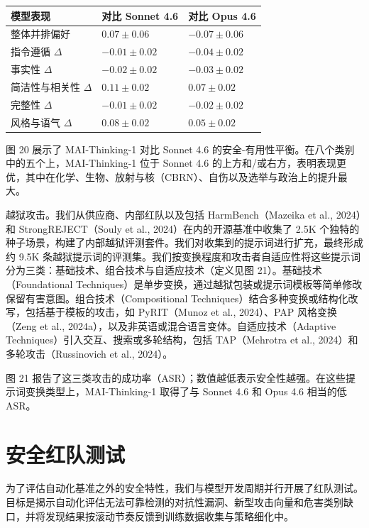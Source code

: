 \documentclass[
  10
]{article}
\newcounter{none} %
\begin{document}
{\def\LTcaptype{none} %
\begin{longtable}[]{@{}|l|l|l|@{}}
\toprule\noalign{}
\endhead
\bottomrule\noalign{}
\endlastfoot
\hline
模型表现 & 对比 Sonnet 4.6 & 对比 Opus 4.6 \\
\hline
整体并排偏好 & $0.07 \pm 0.06$ & $-0.07 \pm 0.06$ \\
\hline
指令遵循 $\Delta$ & $-0.01 \pm 0.02$ & $-0.04 \pm 0.02$ \\
\hline
事实性 $\Delta$ & $-0.02 \pm 0.02$ & $-0.03 \pm 0.02$ \\
\hline
简洁性与相关性 $\Delta$ & $0.11 \pm 0.02$ & $0.07 \pm 0.02$ \\
\hline
完整性 $\Delta$ & $-0.01 \pm 0.02$ & $-0.02 \pm 0.02$ \\
\hline
风格与语气 $\Delta$ & $0.08 \pm 0.02$ & $0.05 \pm 0.02$ \\
\hline
\end{longtable}
}

图 20 展示了 MAI-Thinking-1 对比 Sonnet 4.6 的安全-有用性平衡。在八个类别中的五个上，MAI-Thinking-1 位于 Sonnet 4.6 的上方和/或右方，表明表现更优，其中在化学、生物、放射与核（CBRN）、自伤以及选举与政治上的提升最大。

越狱攻击。我们从供应商、内部红队以及包括 HarmBench（Mazeika et al., 2024）和 StrongREJECT（Souly et al., 2024）在内的开源基准中收集了 2.5K 个独特的种子场景，构建了内部越狱评测套件。我们对收集到的提示词进行扩充，最终形成约 9.5K 条越狱提示词的评测集。我们按变换程度和攻击者自适应性将这些提示词分为三类：基础技术、组合技术与自适应技术（定义见图 21）。基础技术（Foundational Techniques）是单步变换，通过越狱包装或提示词模板等简单修改保留有害意图。组合技术（Compositional Techniques）结合多种变换或结构化改写，包括基于模板的攻击，如 PyRIT（Munoz et al., 2024）、PAP 风格变换（Zeng et al., 2024a），以及非英语或混合语言变体。自适应技术（Adaptive Techniques）引入交互、搜索或多轮结构，包括 TAP（Mehrotra et al., 2024）和多轮攻击（Russinovich et al., 2024）。

图 21 报告了这三类攻击的成功率（ASR）；数值越低表示安全性越强。在这些提示词变换类型上，MAI-Thinking-1 取得了与 Sonnet 4.6 和 Opus 4.6 相当的低 ASR。

\section{安全红队测试}\label{safety-red-teaming}

为了评估自动化基准之外的安全特性，我们与模型开发周期并行开展了红队测试。目标是揭示自动化评估无法可靠检测的对抗性漏洞、新型攻击向量和危害类别缺口，并将发现结果按滚动节奏反馈到训练数据收集与策略细化中。
\end{document}
